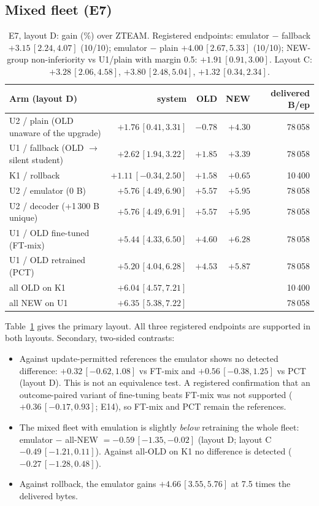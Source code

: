 \documentclass[11pt]{article}
\begin{document}
\subsection{Mixed fleet (E7)}
\begin{table}[t]\centering\small
\begin{tabular}{lrrrr}\toprule
Arm (layout D) & system & OLD & NEW & delivered B/ep\\\midrule
U2 / plain (OLD unaware of the upgrade) & $+1.76\,[0.41, 3.31]$ & $-0.78$ & $+4.30$ & 78\,058\\
U1 / fallback (OLD $\to$ silent student) & $+2.62\,[1.94, 3.22]$ & $+1.85$ & $+3.39$ & 78\,058\\
K1 / rollback & $+1.11\,[-0.34, 2.50]$ & $+1.58$ & $+0.65$ & 10\,400\\
U2 / emulator (0 B) & $+5.76\,[4.49, 6.90]$ & $+5.57$ & $+5.95$ & 78\,058\\
U2 / decoder (+1\,300 B unique) & $+5.76\,[4.49, 6.91]$ & $+5.57$ & $+5.95$ & 78\,058\\
U1 / OLD fine-tuned (FT-mix) & $+5.44\,[4.33, 6.50]$ & $+4.60$ & $+6.28$ & 78\,058\\
U1 / OLD retrained (PCT) & $+5.20\,[4.04, 6.28]$ & $+4.53$ & $+5.87$ & 78\,058\\
all OLD on K1 & $+6.04\,[4.57, 7.21]$ & & & 10\,400\\
all NEW on U1 & $+6.35\,[5.38, 7.22]$ & & & 78\,058\\\bottomrule
\end{tabular}
\caption{E7, layout D: gain (\%) over ZTEAM. Registered endpoints: emulator $-$ fallback $+3.15\,[2.24, 4.07]$ (10/10); emulator $-$
plain $+4.00\,[2.67, 5.33]$ (10/10); NEW-group non-inferiority vs U1/plain with margin 0.5: $+1.91\,[0.91, 3.00]$. Layout C:
$+3.28\,[2.06, 4.58]$, $+3.80\,[2.48, 5.04]$, $+1.32\,[0.34, 2.34]$.}\label{tab:e7}
\end{table}
Table~\ref{tab:e7} gives the primary layout. All three registered endpoints are supported in both layouts. Secondary, two-sided
contrasts:
\begin{itemize}
\item Against update-permitted references the emulator shows no detected difference: $+0.32\,[-0.62, 1.08]$ vs FT-mix and
$+0.56\,[-0.38, 1.25]$ vs PCT (layout D). This is not an equivalence test. A registered confirmation that an outcome-paired variant of
fine-tuning beats FT-mix was not supported ($+0.36\,[-0.17, 0.93]$; E14), so FT-mix and PCT remain the references.
\item The mixed fleet with emulation is slightly \emph{below} retraining the whole fleet: emulator $-$ all-NEW $=-0.59\,[-1.35,-0.02]$
(layout D; layout C $-0.49\,[-1.21, 0.11]$). Against all-OLD on K1 no difference is detected ($-0.27\,[-1.28, 0.48]$).
\item Against rollback, the emulator gains $+4.66\,[3.55, 5.76]$ at 7.5 times the delivered bytes.
\end{itemize}
\end{document}
